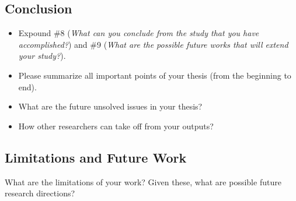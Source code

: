 \begin{singlespace}
    \chapter{Conclusion}
    \label{ch:conclusion}
\end{singlespace}

\begin{itemize}
    \item Expound \#8 (\emph{What can you conclude from the study that you have accomplished?}) and \#9 (\emph{What are the possible future works that will extend your study?}).
    \item Please summarize all important points of your thesis (\ie from the beginning to end).
    \item What are the future unsolved issues in your thesis?
    \item How other researchers can take off from your outputs?
\end{itemize}

\section{Limitations and Future Work}

What are the limitations of your work? Given these, what are possible future research directions?
